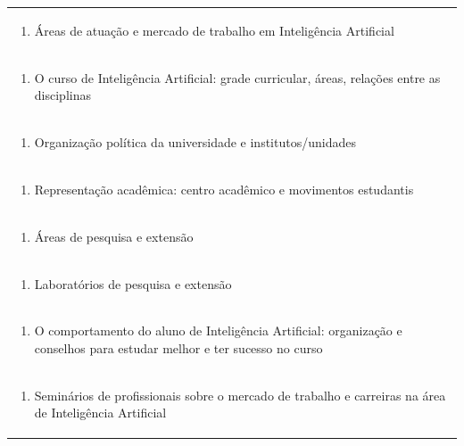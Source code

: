 \documentclass[11pt]{article}
\begin{document}
\begin{center}
\begin{longtable}{|p{4cm}|p{4cm}|p{4cm}|p{4cm}|}
\multicolumn{4}{|p{\dimexpr 16cm + 6\tabcolsep\relax}|}{\begin{enumerate}[start=2]\item Áreas de atuação e mercado de trabalho em Inteligência Artificial\end{enumerate}}\\
\multicolumn{4}{|p{\dimexpr 16cm + 6\tabcolsep\relax}|}{\begin{enumerate}[start=3]\item O curso de Inteligência Artificial: grade curricular, áreas, relações entre as disciplinas\end{enumerate}}\\
\multicolumn{4}{|p{\dimexpr 16cm + 6\tabcolsep\relax}|}{\begin{enumerate}[start=4]\item Organização política da universidade e institutos/unidades\end{enumerate}}\\
\multicolumn{4}{|p{\dimexpr 16cm + 6\tabcolsep\relax}|}{\begin{enumerate}[start=5]\item Representação acadêmica: centro acadêmico e movimentos estudantis\end{enumerate}}\\
\multicolumn{4}{|p{\dimexpr 16cm + 6\tabcolsep\relax}|}{\begin{enumerate}[start=6]\item Áreas de pesquisa e extensão\end{enumerate}}\\
\multicolumn{4}{|p{\dimexpr 16cm + 6\tabcolsep\relax}|}{\begin{enumerate}[start=7]\item Laboratórios de pesquisa e extensão\end{enumerate}}\\
\multicolumn{4}{|p{\dimexpr 16cm + 6\tabcolsep\relax}|}{\begin{enumerate}[start=8]\item O comportamento do aluno de Inteligência Artificial: organização e conselhos para estudar melhor e ter sucesso no curso\end{enumerate}}\\
\multicolumn{4}{|p{\dimexpr 16cm + 6\tabcolsep\relax}|}{\begin{enumerate}[start=9]\item Seminários de profissionais sobre o mercado de trabalho e carreiras na área de Inteligência Artificial\end{enumerate}}\\

\end{longtable}
\end{center}
\end{document}
